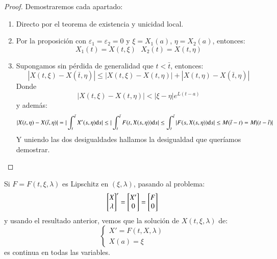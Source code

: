 \begin{proof}
    Demostraremos cada apartado:
    \begin{enumerate}
        \item Directo por el teorema de existencia y unicidad local.
        \item Por la proposición \label{pro:dif-sol-cot} con $\varepsilon_1 = \varepsilon_2 = 0$ y $\xi = X_1(a)$, $\eta = X_2(a)$, entonces:
        $$
            X_1(t) = X(t, \xi)\ \ \ X_2(t) = X(t, \eta)
        $$
        \item Supongamos sin pérdida de generalidad que $t < \bar{t}$, entonces:
        $$
            |X(t, \xi) - X(\bar{t}, \eta)| \leq |X(t, \xi) - X(t, \eta)| + |X(t,\eta) - X(\bar{t}, \eta)|
        $$
        Donde
        $$
        |X(t, \xi) - X(t, \eta)| < |\xi - \eta| e^{L(t-a)}
        $$
        y además:
        $$
            |X(t,\eta) - X(\bar{t}, \eta)| = |\int_t^{\bar{t}} X'(s, \eta) \mathrm{d} s| \leq |\int_t^{\bar{t}} F(t, X(s, \eta)) \mathrm{d} s | \leq \int_t^{\bar{t}} |F(s, X(s, \eta)) \mathrm{d} s | \leq M(\bar{t} - t) = M|(t-\bar{t})|
        $$
        Y uniendo las dos desigualdades hallamos la desigualdad que queríamos demostrar.
    \end{enumerate}
\end{proof}
\begin{cor}
    Si $F = F(t, \xi, \lambda)$ es Lipschitz en $(\xi, \lambda)$, pasando al problema:
    $$
        \mx{X\\\lambda}' = \mx{X'\\ 0} = \mx{F\\0}
    $$
    y usando el resultado anterior, vemos que la solución de $X(t, \xi, \lambda)$ de:
    $$
        \begin{cases}
            X' = F(t, X, \lambda)\\
            X(a) = \xi
        \end{cases}
    $$
    es continua en todas las variables.
\end{cor}

